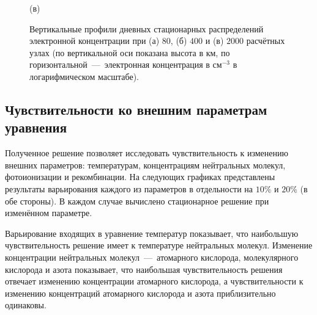 \documentclass[14pt, a4paper, fleqn]{extarticle}
\begin{document}
\begin{figure}[H]
(в)
\caption{Вертикальные профили дневных стационарных распределений электронной концентрации при (а) $80$, (б) $400$ и (в) $2000$ расчётных узлах (по вертикальной оси показана высота в км, по горизонтальной~---~электронная концентрация в см$^{-3}$ в логарифмическом масштабе).}
\end{figure}

\subsection{Чувствительности ко внешним параметрам уравнения}



Полученное решение позволяет исследовать чувствительность к изменению внешних параметров: температурам, концентрациям нейтральных молекул, фотоионизации и рекомбинации. На следующих графиках представлены результаты варьирования каждого из параметров в отдельности на $10\%$ и $20\%$ (в обе стороны). В каждом случае вычислено стационарное решение при изменённом параметре.

\medskip

Варьирование входящих в уравнение температур показывает, что наибольшую чувствительность решение имеет к температуре нейтральных молекул. Изменение концентрации нейтральных молекул~---~атомарного кислорода, молекулярного кислорода и азота показывает, что наибольшая чувствительность решения отвечает изменению концентрации атомарного кислорода, а чувствительности к изменению концентраций атомарного кислорода и азота приблизительно одинаковы.

\medskip
\end{document}
